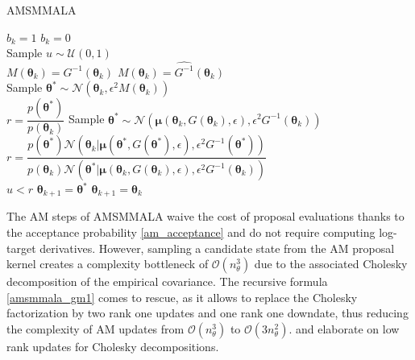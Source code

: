 \documentclass[twoside,11pt]{article}
\begin{document}
\begin{algorithm}[t]
	\caption{AMSMMALA}
	\label{amsmmala}
	\begin{algorithmic}
		\State $b_k = 1$
		\Else
		\State $b_k = 0$
		\EndIf\\
		
		\State Sample $u\sim\mathcal{U}(0, 1)$\\
		
		 
		\State $M(\boldsymbol{\theta}_k)=G^{-1}(\boldsymbol{\theta}_k)$
		\State $M(\boldsymbol{\theta}_k)=\widehat{G^{-1}}(\boldsymbol{\theta}_{k})$
		\EndIf\\

		\State Sample 
		$\boldsymbol{\theta^{*}}
		\sim\mathcal{N}(\boldsymbol{\theta}_k,
		\epsilon^2 M(\boldsymbol{\theta}_k)) %
		$\\
		
		\State $r = \dfrac{p(\boldsymbol{\theta}^{*})}{p(\boldsymbol{\theta}_k)}$
		 
		\State Sample 
		$\boldsymbol{\theta^{*}}
		\sim\mathcal{N}(\boldsymbol{\mu}(\boldsymbol{\theta}_k, G(\boldsymbol{\theta}_k), \epsilon),
		\epsilon^2 G^{-1}(\boldsymbol{\theta}_k))
		$\\

		\State $r = \dfrac{
				p(\boldsymbol{\theta}^{*})
				\mathcal{N}(\boldsymbol{\theta}_k|
				\boldsymbol{\mu}(\boldsymbol{\theta}^{*},
				G(\boldsymbol{\theta}^{*}),
				\epsilon),
				\epsilon^2 G^{-1}(\boldsymbol{\theta}^{*}))
			}
			{
				p(\boldsymbol{\theta}_k)
				\mathcal{N}(\boldsymbol{\theta}^{*}|
				\boldsymbol{\mu}(\boldsymbol{\theta}_k,
				G(\boldsymbol{\theta}_k),
				\epsilon),
				\epsilon^2 G^{-1}(\boldsymbol{\theta}_k))
			}$
		\EndIf\\

		\If
		{
			$u<r$
		}
		  \State $\boldsymbol{\theta}_{k+1}=\boldsymbol{\theta}^{*}$
		\Else
		  \State $\boldsymbol{\theta}_{k+1}=\boldsymbol{\theta}_k$		
		\EndIf
		
		\EndFor
	\end{algorithmic}
\end{algorithm}

The AM steps of AMSMMALA waive the cost of proposal evaluations thanks to the acceptance probability \eqref{am_acceptance}
and do not require computing log-target derivatives. However, sampling a candidate state from the AM proposal kernel creates
a complexity bottleneck of $\mathcal{O}(n_{\theta}^3)$ due to the associated Cholesky decomposition of the empirical 
covariance. The recursive formula \eqref{amsmmala_gm1} comes to rescue, as it allows to replace the Cholesky factorization 
by two rank one updates and one rank one downdate, thus reducing the complexity of AM updates from 
$\mathcal{O}(n_{\theta}^3)$ to $\mathcal{O}(3n_{\theta}^2)$. \cite{gill_gol_wal__met} and \cite{see__low} elaborate on low 
rank updates for Cholesky decompositions.
\end{document}
